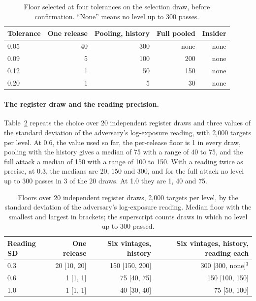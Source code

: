 \begin{table}[ht]
\centering
\caption{Floor selected at four tolerances on the selection draw, before
confirmation. ``None'' means no level up to 300 passes.}
\label{c13:tab-tol}
\small
\begin{tabular}{lrrrr}
\toprule
Tolerance & One release & Pooling, history & Full pooled & Insider \\
\midrule
0.05 & 40 & 300 & none & none \\
0.09 & 5  & 100 & 200  & none \\
0.12 & 1  & 50  & 150  & none \\
0.20 & 1  & 5   & 30   & none \\
\bottomrule
\end{tabular}
\end{table}

\paragraph{The register draw and the reading precision.} Table~\ref{c13:tab-rep}
repeats the choice over 20 independent register draws and three values of the
standard deviation of the adversary's log-exposure reading, with 2{,}000 targets per
level. At 0.6, the value used so far, the per-release floor is 1 in every draw,
pooling with the history gives a median of 75 with a range of 40 to 75, and the full
attack a median of 150 with a range of 100 to 150. With a reading twice as precise,
at 0.3, the medians are 20, 150 and 300, and for the full attack no level up to 300
passes in 3 of the 20 draws. At 1.0 they are 1, 40 and 75.

\begin{table}[ht]
\centering
\caption{Floors over 20 independent register draws, 2{,}000 targets per level, by the
standard deviation of the adversary's log-exposure reading. Median floor with the
smallest and largest in brackets; the superscript counts draws in which no level up
to 300 passed.}
\label{c13:tab-rep}
\small
\begin{tabular}{lrrr}
\toprule
Reading SD & One release & Six vintages, history & Six vintages, history, reading each \\
\midrule
0.3 & 20 [10, 20] & 150 [150, 200] & 300 [300, none]$^{3}$ \\
0.6 & 1 [1, 1]    & 75 [40, 75]    & 150 [100, 150] \\
1.0 & 1 [1, 1]    & 40 [30, 40]    & 75 [50, 100] \\
\bottomrule
\end{tabular}
\end{table}

